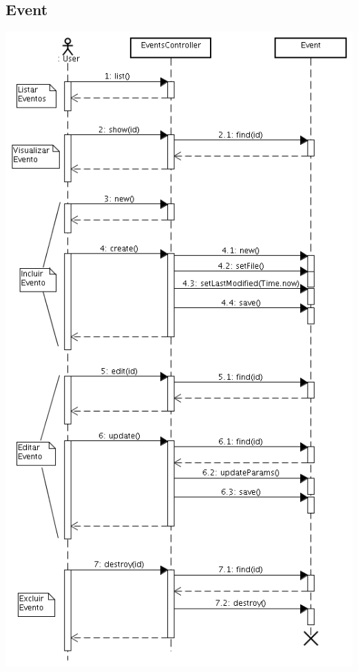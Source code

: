 \documentclass[11pt]{article}
\begin{document}
\subsection{Event}
\includegraphics[width=130truemm]{seq_event.png}
\end{document}
